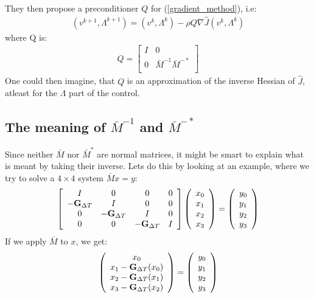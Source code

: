 They then propose a preconditioner $Q$ for (\ref{gradient_method}), i.e:
\begin{align}
(v^{k+1},\Lambda^{k+1}) = (v^{k},\Lambda^{k}) -\rho Q\nabla\hat{J}(v^{k},\Lambda^{k}) 
\end{align}
where Q is:
\begin{align}
Q = \left[ \begin{array}{cc}
	I & 0 \\
	0 & \bar{M}^{-1}\bar{M}^{-*} \\
	\end{array} \right] \label{PC}
\end{align}
One could then imagine, that $Q$ is an approximation of the inverse Hessian of $\hat{J}$, atleast for the $\Lambda$ part of the control.
\subsection{The meaning of $\bar{M}^{-1}$ and $\bar{M}^{-*}$}
Since neither $\bar{M}$ nor $\bar{M}^{*}$ are normal matrices, it might be smart to explain what is meant by taking their inverse. Lets do this by looking at an example, where we try to solve a $4\times 4$ system $\bar{M}x = y$:
\begin{align}
\left[ \begin{array}{cccc}
   I & 0 & 0 & 0 \\  
   -\bold{G}_{\Delta T} & I & 0 & 0 \\ 
   0 &-\bold{G}_{\Delta T} & I  & 0 \\
   0 &0 &-\bold{G}_{\Delta T} & I   \\
   \end{array}  \right]
   \left( \begin{array}{c}
   x_0 \\
   x_1 \\
   x_2 \\
   x_3 \\
   \end{array} \right) =
   \left( \begin{array}{c}
   y_0 \\
   y_1 \\
   y_2 \\
   y_3 \\
   \end{array} \right)	
\end{align}  
If we apply $\bar{M}$ to $x$, we get:
\begin{align}
\left( \begin{array}{c}
   x_0 \\
   x_1 -\bold{G}_{\Delta T}(x_0) \\
   x_2 -\bold{G}_{\Delta T}(x_1)\\
   x_3 -\bold{G}_{\Delta T}(x_2)\\
   \end{array} \right) =
   \left( \begin{array}{c}
   y_0 \\
   y_1 \\
   y_2 \\
   y_3 \\
   \end{array} \right)
\end{align}
